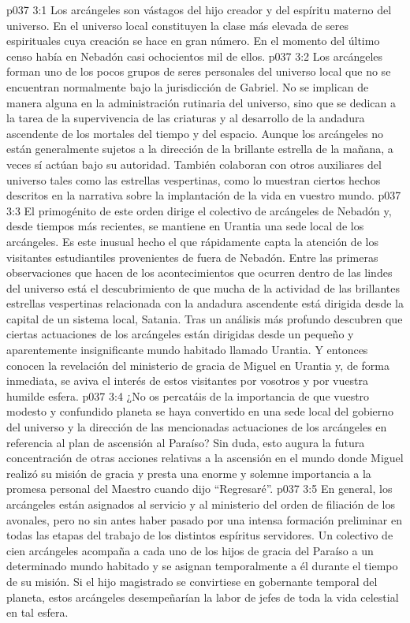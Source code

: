 \vs p037 3:1 Los arcángeles son vástagos del hijo creador y del espíritu materno del universo. En el universo local constituyen la clase más elevada de seres espirituales cuya creación se hace en gran número. En el momento del último censo había en Nebadón casi ochocientos mil de ellos.
\vs p037 3:2 Los arcángeles forman uno de los pocos grupos de seres personales del universo local que no se encuentran normalmente bajo la jurisdicción de Gabriel. No se implican de manera alguna en la administración rutinaria del universo, sino que se dedican a la tarea de la supervivencia de las criaturas y al desarrollo de la andadura ascendente de los mortales del tiempo y del espacio. Aunque los arcángeles no están generalmente sujetos a la dirección de la brillante estrella de la mañana, a veces sí actúan bajo su autoridad. También colaboran con otros auxiliares del universo tales como las estrellas vespertinas, como lo muestran ciertos hechos descritos en la narrativa sobre la implantación de la vida en vuestro mundo.
\vs p037 3:3 \pc El primogénito de este orden dirige el colectivo de arcángeles de Nebadón y, desde tiempos más recientes, se mantiene en Urantia una sede local de los arcángeles. Es este inusual hecho el que rápidamente capta la atención de los visitantes estudiantiles provenientes de fuera de Nebadón. Entre las primeras observaciones que hacen de los acontecimientos que ocurren dentro de las lindes del universo está el descubrimiento de que mucha de la actividad de las brillantes estrellas vespertinas relacionada con la andadura ascendente está dirigida desde la capital de un sistema local, Satania. Tras un análisis más profundo descubren que ciertas actuaciones de los arcángeles están dirigidas desde un pequeño y aparentemente insignificante mundo habitado llamado Urantia. Y entonces conocen la revelación del ministerio de gracia de Miguel en Urantia y, de forma inmediata, se aviva el interés de estos visitantes por vosotros y por vuestra humilde esfera.
\vs p037 3:4 ¿No os percatáis de la importancia de que vuestro modesto y confundido planeta se haya convertido en una sede local del gobierno del universo y la dirección de las mencionadas actuaciones de los arcángeles en referencia al plan de ascensión al Paraíso? Sin duda, esto augura la futura concentración de otras acciones relativas a la ascensión en el mundo donde Miguel realizó su misión de gracia y presta una enorme y solemne importancia a la promesa personal del Maestro cuando dijo “Regresaré”.
\vs p037 3:5 \pc En general, los arcángeles están asignados al servicio y al ministerio del orden de filiación de los avonales, pero no sin antes haber pasado por una intensa formación preliminar en todas las etapas del trabajo de los distintos espíritus servidores. Un colectivo de cien arcángeles acompaña a cada uno de los hijos de gracia del Paraíso a un determinado mundo habitado y se asignan temporalmente a él durante el tiempo de su misión. Si el hijo magistrado se convirtiese en gobernante temporal del planeta, estos arcángeles desempeñarían la labor de jefes de toda la vida celestial en tal esfera.
